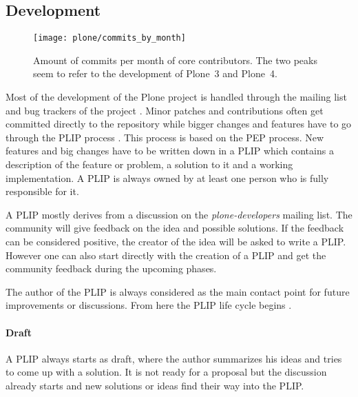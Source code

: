 
\subsection{Development} %

\begin{figure}[thbp]
  \centering
  \texttt{[image: plone/commits\_by\_month]}
  \caption[Commits by Month, Plone]
  {Amount of commits per month of core contributors. The two peaks seem to
    refer to the development of Plone~3 and Plone~4.}
  \label{fig:plone:cbm}
\end{figure}

Most of the development of the Plone project is handled through the mailing
list and bug trackers of the project
\cite{PloneContribute,PloneCommunityProcesses}. Minor patches and contributions
often get committed directly to the repository while bigger changes and
features have to go through the \ac{PLIP} process
\cite{PlonePLIPProcess,PloneCommunityProcesses,PlonePLIPLifecycle}. This
process is based on the \acl{PEP} process. New features and big changes have to
be written down in a \ac{PLIP} which contains a description of the feature or
problem, a solution to it and a working implementation. A \ac{PLIP} is always
owned by at least one person who is fully responsible for it.

A \ac{PLIP} mostly derives from a discussion on the \emph{plone-developers}
mailing list. The community will give feedback on the idea and possible
solutions. If the feedback can be considered positive, the creator of the idea
will be asked to write a \ac{PLIP}. However one can also start directly with
the creation of a \ac{PLIP} and get the community feedback during the upcoming
phases.

The author of the \ac{PLIP} is always considered as the main contact point for
future improvements or discussions. From here the \ac{PLIP} life cycle begins
\cite{PlonePLIPLifecycle}.

\paragraph{Draft}

A \ac{PLIP} always starts as draft, where the author summarizes his ideas and
tries to come up with a solution. It is not ready for a proposal but the
discussion already starts and new solutions or ideas find their way into the
\ac{PLIP}.

